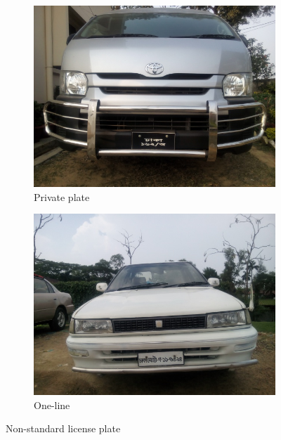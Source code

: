 \documentclass{standalone}
\begin{document}
\begin{figure}
\begin{subfigure}{0.5\textwidth}
    \centering
    \includegraphics[width=0.9\linewidth]{./img/experiment/stage.1/nostd2}
    \caption{Private plate}
\end{subfigure}
\begin{subfigure}{0.5\textwidth}
    \centering
    \includegraphics[width=0.9\linewidth]{./img/experiment/stage.1/nostd}
    \caption{One-line}
\end{subfigure}
\caption{Non-standard license plate}
\end{figure}
\end{document}
